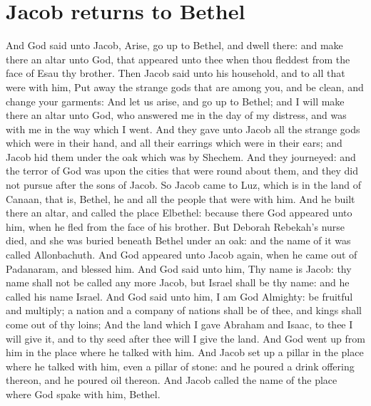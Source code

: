 \section*{Jacob returns to Bethel}
\begin{biblechapter} %
\verse And God said unto Jacob, Arise, go up to Bethel, and dwell there: and make there an altar unto God, that appeared unto thee when thou fleddest from the face of Esau thy brother.
\verse Then Jacob said unto his household, and to all that were with him, Put away the strange gods that are among you, and be clean, and change your garments:
\verse And let us arise, and go up to Bethel; and I will make there an altar unto God, who answered me in the day of my distress, and was with me in the way which I went.
\verse And they gave unto Jacob all the strange gods which were in their hand, and all their earrings which were in their ears; and Jacob hid them under the oak which was by Shechem.
\verse And they journeyed: and the terror of God was upon the cities that were round about them, and they did not pursue after the sons of Jacob.
\verse So Jacob came to Luz, which is in the land of Canaan, that is, Bethel, he and all the people that were with him.
\verse And he built there an altar, and called the place Elbethel: because there God appeared unto him, when he fled from the face of his brother.
\verse But Deborah Rebekah's nurse died, and she was buried beneath Bethel under an oak: and the name of it was called Allonbachuth.
\verse And God appeared unto Jacob again, when he came out of Padanaram, and blessed him.
\verse And God said unto him, Thy name is Jacob: thy name shall not be called any more Jacob, but Israel shall be thy name: and he called his name Israel.
\verse And God said unto him, I am God Almighty: be fruitful and multiply; a nation and a company of nations shall be of thee, and kings shall come out of thy loins;
\verse And the land which I gave Abraham and Isaac, to thee I will give it, and to thy seed after thee will I give the land.
\verse And God went up from him in the place where he talked with him.
\verse And Jacob set up a pillar in the place where he talked with him, even a pillar of stone: and he poured a drink offering thereon, and he poured oil thereon.
\verse And Jacob called the name of the place where God spake with him, Bethel.

\end{biblechapter}
